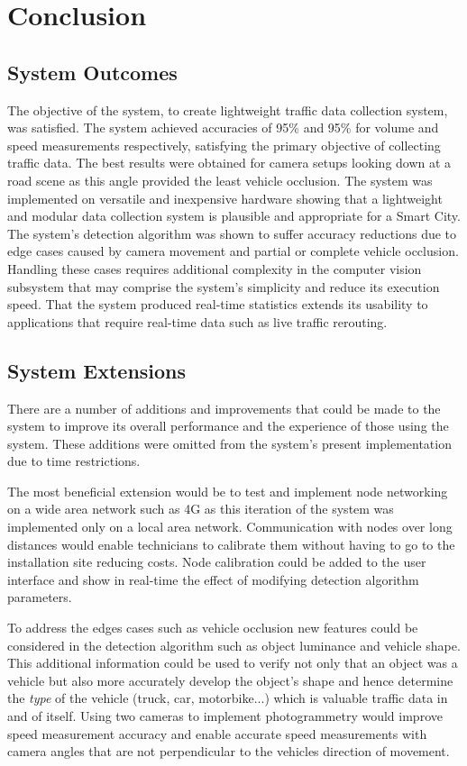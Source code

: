 \chapter{Conclusion}

\section{System Outcomes}

The objective of the system, to create lightweight traffic data collection system, was satisfied. The system achieved accuracies of 95\% and 95\% for volume and speed measurements respectively, satisfying the primary objective of collecting traffic data. The best results were obtained for camera setups looking down at a road scene as this angle provided the least vehicle occlusion. The system was implemented on versatile and inexpensive hardware showing that a lightweight and modular data collection system is plausible and appropriate for a Smart City. The system's detection algorithm was shown to suffer accuracy reductions due to edge cases caused by camera movement and partial or complete vehicle occlusion. Handling these cases requires additional complexity in the computer vision subsystem that may comprise the system's simplicity and reduce its execution speed. That the system produced real-time statistics extends its usability to applications that require real-time data such as live traffic rerouting. 

\section{System Extensions}

There are a number of additions and improvements that could be made to the system to improve its overall performance and the experience of those using the system. These additions were omitted from the system's present implementation due to time restrictions. 

The most beneficial extension would be to test and implement node networking on a wide area network such as 4G as this iteration of the system was implemented only on a local area network. Communication with nodes over long distances would enable technicians to calibrate them without having to go to the installation site reducing costs. Node calibration could be added to the user interface and show in real-time the effect of modifying detection algorithm parameters. 

To address the edges cases such as vehicle occlusion new features could be considered in the detection algorithm such as object luminance and vehicle shape. This additional information could be used to verify not only that an object was a vehicle but also more accurately develop the object's shape and hence determine the \emph{type} of the vehicle (truck, car, motorbike...) which is valuable traffic data in and of itself. Using two cameras to implement photogrammetry would improve speed measurement accuracy and enable accurate speed measurements with camera angles that are not perpendicular to the vehicles direction of movement.

